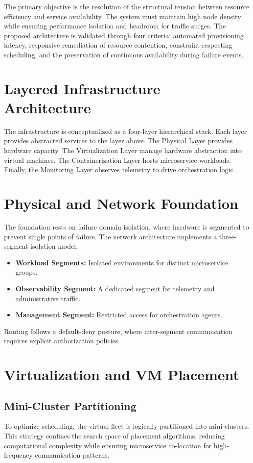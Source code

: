 \documentclass[12pt,a4paper]{report}
\begin{document}
The primary objective is the resolution of the structural tension between resource efficiency and service availability. The system must maintain high node density while ensuring performance isolation and headroom for traffic surges. The proposed architecture is validated through four criteria: automated provisioning latency, responsive remediation of resource contention, constraint-respecting scheduling, and the preservation of continuous availability during failure events.

\section{Layered Infrastructure Architecture}

The infrastructure is conceptualized as a four-layer hierarchical stack. Each layer provides abstracted services to the layer above. The Physical Layer provides hardware capacity. The Virtualization Layer manage hardware abstraction into virtual machines. The Containerization Layer hosts microservice workloads. Finally, the Monitoring Layer observes telemetry to drive orchestration logic.

\section{Physical and Network Foundation}

The foundation rests on failure domain isolation, where hardware is segmented to prevent single points of failure. The network architecture implements a three-segment isolation model:
\begin{itemize}
    \item \textbf{Workload Segments:} Isolated environments for distinct microservice groups.
    \item \textbf{Observability Segment:} A dedicated segment for telemetry and administrative traffic.
    \item \textbf{Management Segment:} Restricted access for orchestration agents.
\end{itemize}

Routing follows a default-deny posture, where inter-segment communication requires explicit authorization policies.

\section{Virtualization and VM Placement}

\subsection{Mini-Cluster Partitioning}
To optimize scheduling, the virtual fleet is logically partitioned into mini-clusters. This strategy confines the search space of placement algorithms, reducing computational complexity while ensuring microservice co-location for high-frequency communication patterns.
\end{document}
